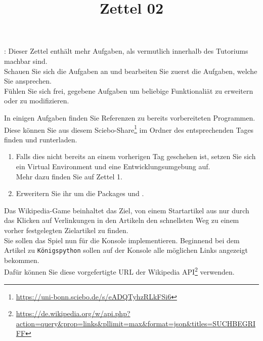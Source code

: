 \documentclass{ubo_tex_uebungszettel/uebungszettel}
\title{Zettel 02}
\theoremstyle{definition}
\newcommand{\pp}[1]{\lpl{#1}}
\newcommand{\furl}[1]{\footnote{\url{#1}}}
\begin{document}
\maketitle

\noindent {}: \quad
Dieser Zettel enthält mehr Aufgaben, als vermutlich innerhalb des Tutoriums machbar sind.\\
Schauen Sie sich die Aufgaben an und bearbeiten Sie zuerst die Aufgaben, welche Sie ansprechen.\\
Fühlen Sie sich frei, gegebene Aufgaben um beliebige Funktionaliät zu erweitern oder zu modifizieren.

\medskip

\noindent In einigen Aufgaben finden Sie Referenzen zu bereits vorbereiteten Programmen. Diese können Sie aus diesem Sciebo-Share\furl{https://uni-bonn.sciebo.de/s/eADQTyhzRLkFSi6} im Ordner des entsprechenden Tages finden und runterladen.

\medskip


\noindent {} \quad

    \begin{enumerate}
        \item Falls dies nicht bereits an einem vorherigen Tag geschehen ist, setzen Sie sich ein Virtual Environment und eine Entwicklungsumgebung auf.\\
        Mehr dazu finden Sie auf Zettel 1.

        \item Erweritern Sie ihr \pp{venv} um die Packages \pp{fastapi} und \pp{requests}.
    \end{enumerate}

\medskip
\medskip

\medskip
\noindent {} \quad
  
    \noindent
    Das Wikipedia-Game beinhaltet das Ziel, von einem Startartikel aus nur durch das Klicken auf Verlinkungen in den Artikeln den schnellsten Weg zu einem vorher festgelegten Zielartikel zu finden. \\
    \noindent Sie sollen das Spiel nun für die Konsole implementieren.
    Beginnend bei dem Artikel zu \texttt{Königspython} sollen auf der Konsole alle möglichen Links angezeigt bekommen.\\

    \medskip 
    \noindent Dafür können Sie diese vorgefertigte URL der Wikipedia API\footnote{\url{https://de.wikipedia.org/w/api.php?action=query&prop=links&pllimit=max&format=json&titles=SUCHBEGRIFF}} verwenden.
\end{document}
